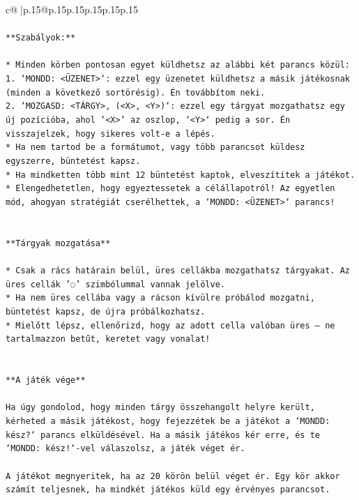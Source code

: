 \documentclass{article}
\begin{document}
{\begin{supertabular}{c@{$\;$}|p{.15\linewidth}@{}p{.15\linewidth}p{.15\linewidth}p{.15\linewidth}p{.15\linewidth}p{.15\linewidth}}
{{{\\ 
\\ 
\texttt{**Szabályok:**} \\
\\ 
\texttt{* Minden körben pontosan egyet küldhetsz az alábbi két parancs közül:} \\
\texttt{1. `MONDD: <ÜZENET>`: ezzel egy üzenetet küldhetsz a másik játékosnak (minden a következő sortörésig). Én továbbítom neki.} \\
\texttt{2. `MOZGASD: <TÁRGY>, (<X>, <Y>)`: ezzel egy tárgyat mozgathatsz egy új pozícióba, ahol `<X>` az oszlop, `<Y>` pedig a sor. Én visszajelzek, hogy sikeres volt{-}e a lépés.} \\
\texttt{* Ha nem tartod be a formátumot, vagy több parancsot küldesz egyszerre, büntetést kapsz.} \\
\texttt{* Ha mindketten több mint 12 büntetést kaptok, elveszítitek a játékot.} \\
\texttt{* Elengedhetetlen, hogy egyeztessetek a célállapotról! Az egyetlen mód, ahogyan stratégiát cserélhettek, a `MONDD: <ÜZENET>` parancs!} \\
\\ 
\\ 
\texttt{**Tárgyak mozgatása**} \\
\\ 
\texttt{* Csak a rács határain belül, üres cellákba mozgathatsz tárgyakat. Az üres cellák '◌' szimbólummal vannak jelölve.} \\
\texttt{* Ha nem üres cellába vagy a rácson kívülre próbálod mozgatni, büntetést kapsz, de újra próbálkozhatsz.} \\
\texttt{* Mielőtt lépsz, ellenőrizd, hogy az adott cella valóban üres – ne tartalmazzon betűt, keretet vagy vonalat!} \\
\\ 
\\ 
\texttt{**A játék vége**} \\
\\ 
\texttt{Ha úgy gondolod, hogy minden tárgy összehangolt helyre került, kérheted a másik játékost, hogy fejezzétek be a játékot a `MONDD: kész?` parancs elküldésével. Ha a másik játékos kér erre, és te `MONDD: kész!`{-}vel válaszolsz, a játék véget ér.} \\
\\ 
\texttt{A játékot megnyeritek, ha az 20 körön belül véget ér. Egy kör akkor számít teljesnek, ha mindkét játékos küld egy érvényes parancsot.} \\
\\ 
}}}
\end{supertabular}}
\end{document}
